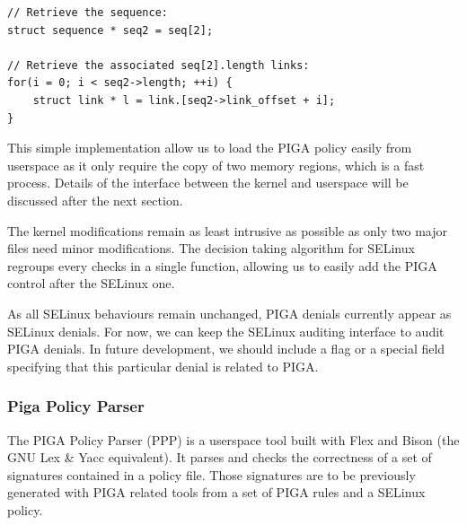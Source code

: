 \documentclass[pdftex,a4paper,titlepage,11pt]{article}
\begin{document}
\begin{lstlisting}
// Retrieve the sequence:
struct sequence * seq2 = seq[2];

// Retrieve the associated seq[2].length links:
for(i = 0; i < seq2->length; ++i) {
	struct link * l = link.[seq2->link_offset + i];
}
\end{lstlisting}

\smallskip

This simple implementation allow us to load the PIGA policy easily from userspace as it only require the copy of two memory regions, which is a fast process. Details of the interface between the kernel and userspace will be discussed after the next section.

\bigskip

The kernel modifications remain as least intrusive as possible as only two major files need minor modifications. The decision taking algorithm for SELinux regroups every checks in a single function, allowing us to easily add the PIGA control after the SELinux one.

\bigskip

As all SELinux behaviours remain unchanged, PIGA denials currently appear as SELinux denials. For now, we can keep the SELinux auditing interface to audit PIGA denials. In future development, we should include a flag or a special field specifying that this particular denial is related to PIGA.

\subsubsection{Piga Policy Parser}

The PIGA Policy Parser (PPP) is a userspace tool built with Flex and Bison (the GNU Lex \& Yacc equivalent). It parses and checks the correctness of a set of signatures contained in a policy file. Those signatures are to be previously generated with PIGA related tools from a set of PIGA rules and a SELinux policy.
\end{document}
